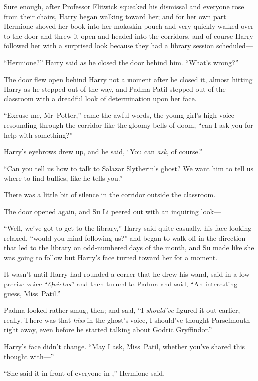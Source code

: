 Sure enough, after Professor Flitwick squeaked his dismissal and everyone rose from their chairs, Harry began walking toward her; and for her own part Hermione shoved her book into her mokeskin pouch and very quickly walked over to the door and threw it open and headed into the corridors, and of course Harry followed her with a surprised look because they had a library session scheduled—

“Hermione?” Harry said as he closed the door behind him. “What’s wrong?”

The door flew open behind Harry not a moment after he closed it, almost hitting Harry as he stepped out of the way, and Padma Patil stepped out of the classroom with a dreadful look of determination upon her face.

“Excuse me, Mr~Potter,” came the awful words, the young girl’s high voice resounding through the corridor like the gloomy bells of doom, “can I ask you for help with something?”

Harry’s eyebrows drew up, and he said, “You can \emph{ask}, of course.”

“Can you tell us how to talk to Salazar Slytherin’s ghost? We want him to tell us where to find bullies, like he tells you.”

There was a little bit of silence in the corridor outside the classroom.

The door opened again, and Su Li peered out with an inquiring look—

“Well, we’ve got to get to the library,” Harry said quite casually, his face looking relaxed, “would you mind following us?” and began to walk off in the direction that led to the library on odd-numbered days of the month, and Su made like she was going to follow but Harry’s face turned toward her for a moment.

It wasn’t until Harry had rounded a corner that he drew his wand, said in a low precise voice “\emph{Quietus}” and then turned to Padma and said, “An interesting guess, Miss~Patil.”

Padma looked rather smug, then; and said, “I \emph{should’ve} figured it out earlier, really. There was that \emph{hiss} in the ghost’s voice, I should’ve thought Parselmouth right away, even before he started talking about Godric Gryffindor.”

Harry’s face didn’t change. “May I ask, Miss~Patil, whether you’ve shared this thought with—”

“She said it in front of everyone in \SPHEW,” Hermione said.

